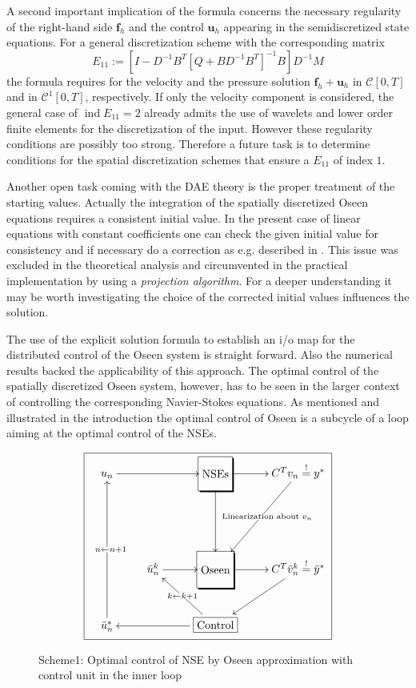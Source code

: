 \documentclass[a4paper,10pt,BCOR=15mm]{scrbook}
\DeclareMathOperator{\ind}{ind}
\begin{document}
A second important implication of the formula concerns the necessary regularity of the right-hand side $\mathbf f_h$ and the control $\mathbf u_h$ appearing in the semidiscretized state equations. For a general discretization scheme with the corresponding matrix
\begin{equation*}
 E_{11} := [I-D^{-1}B^T[Q+BD^{-1}B^T]^{-1}B]D^{-1}M 
\end{equation*}
the formula requires for the velocity and the pressure solution $\mathbf f_h + \mathbf u_h$ in $\mathcal C[0,T]$ and in $\mathcal C^1[0,T]$, respectively. If only the velocity component is considered, the general case of $\ind E_{11}=2$ already admits the use of wavelets and lower order finite elements for the discretization of the input. However these regularity conditions are possibly too strong. Therefore a future task is to determine conditions for the spatial discretization schemes that ensure a $E_{11}$ of index $1$.

Another open task coming with the DAE theory is the proper treatment of the starting values. Actually the integration of the spatially discretized Oseen equations requires a consistent initial value. In the present case of linear equations with constant coefficients one can check the given initial value for consistency and if necessary do a correction as e.g. described in \cite[p. 309]{mehr}. This issue was excluded in the theoretical analysis and circumvented in the practical implementation by using a \textit{projection algorithm}. For a deeper understanding it may be worth investigating the choice of the corrected initial values influences the solution.

The use of the explicit solution formula to establish an i/o map for the distributed control of the Oseen system is straight forward. Also the numerical results backed the applicability of this approach. The optimal control of the spatially discretized Oseen system, however, has to be seen in the larger context of controlling the corresponding Navier-Stokes equations. As mentioned and illustrated in the introduction the optimal control of Oseen is a subcycle of a loop aiming at the optimal control of the NSEs.

\begin{figure}[htbp]
\begin{equation*}
\boxed{
 \xymatrix{
u_n  \ar[rr] & &*+=[F-,]\txt{~NSEs~ }\ar[dd] \ar[r] &C^Tv_n \stackrel{!}{=}y^* \ar[ddl]|-{\text{~~~~Linearization about $v_n$}}  \\  & & & \\
 & \bar u_n^k \ar[r] &*+=[F-,]\txt{~Oseen~ } \ar[r] &C^T\bar v_n^k \stackrel{!}{=}\bar y^* \ar[ld] \\
\bar u_{n}^* \ar[uuu]|- {~~n \leftarrow n+1} & &\framebox{Control} \ar [ll] \ar[lu]|- {k \leftarrow k+1 }  &
}
}
\end{equation*}
\caption{Scheme1: Optimal control of NSE by Oseen approximation with control unit in the inner loop}
\label{optscheme2}
\end{figure}
\end{document}
